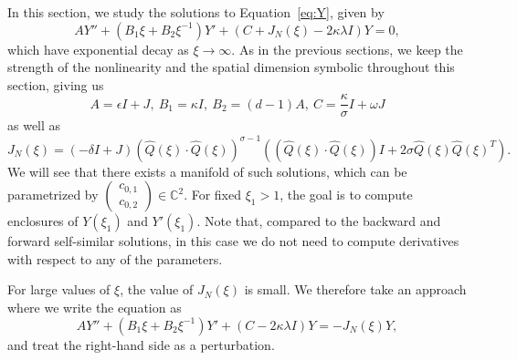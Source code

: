 \documentclass[11pt]{article}
\begin{document}
In this section, we study the solutions to Equation~\eqref{eq:Y}, given
by
\begin{equation*}
  AY'' + (B_{1}\xi + B_{2}\xi^{-1})Y' + (C + J_{N}(\xi) - 2\kappa\lambda I)Y = 0,
\end{equation*}
which have exponential decay as \(\xi \to \infty\). As in the previous
sections, we keep the strength of the nonlinearity and the spatial
dimension symbolic throughout this section, giving us
\begin{equation}\label{eq:ABC-sigma-d}
  A = \epsilon I + J,\
  B_{1} = \kappa I,\
  B_{2} = (d - 1)A,\
  C = \frac{\kappa}{\sigma} I + \omega J
\end{equation}
as well as
\begin{equation}\label{eq:J_N-sigma-d}
  J_{N}(\xi) = (-\delta I + J)(\hat{Q}(\xi) \cdot \hat{Q}(\xi))^{\sigma - 1}((\hat{Q}(\xi) \cdot \hat{Q}(\xi))I + 2\sigma\hat{Q}(\xi)\hat{Q}(\xi)^{T}).
\end{equation}
We will see that there exists a manifold of such solutions, which can
be parametrized by
\(\begin{pmatrix} c_{0,1} \\ c_{0,2}\end{pmatrix} \in
\mathbb{C}^{2}\). For fixed \(\xi_{1} > 1\), the goal is to compute
enclosures of \(Y(\xi_{1})\) and \(Y'(\xi_{1})\). Note that, compared
to the backward and forward self-similar solutions, in this case we do
not need to compute derivatives with respect to any of the parameters.

For large values of \(\xi\), the value of \(J_{N}(\xi)\) is small. We
therefore take an approach where we write the equation as
\begin{equation*}
  AY'' + (B_{1}\xi + B_{2}\xi^{-1})Y' + (C - 2\kappa\lambda I)Y = -J_{N}(\xi)Y,
\end{equation*}
and treat the right-hand side as a perturbation.
\end{document}
